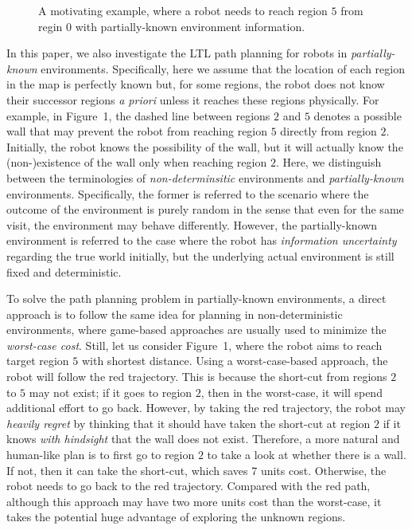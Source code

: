 \documentclass{ifacconf}
\begin{document}
  

\newcommand\kk{1.2}
\begin{figure}
\centering

	\caption{A motivating example, where a robot needs to reach region $5$ from regin $0$ with partially-known environment information.}
	\label{fig:motiexam}
\end{figure}   


In this paper, we also investigate the LTL path planning for robots in \emph{partially-known} environments. Specifically, here we assume that the location of each region in the map is perfectly known but, for some regions, the robot does not know their successor regions \emph{a priori} unless it reaches these regions physically. For example, in Figure~1, the dashed line between regions $2$ and $5$ denotes a possible wall that may prevent the robot from reaching region $5$ directly from region $2$. Initially, the robot knows the possibility of the wall, but it will actually know the (non-)existence of the wall only when reaching region $2$.  Here, we distinguish between the terminologies of \emph{non-determinsitic} environments and \emph{partially-known} environments. Specifically, the former is referred to the scenario where the outcome of the environment is purely random in the sense that even for the same visit, the environment may behave differently. However, the partially-known environment is referred to the case where the robot has \emph{information uncertainty} regarding the true world initially, but the underlying actual environment is still fixed and deterministic. 

To solve the path planning problem in partially-known environments, a direct approach is to follow the same idea for planning in non-deterministic environments, where game-based approaches are usually used to minimize the \emph{worst-case cost}. Still, let us consider Figure~1, where the robot aims to reach target region $5$ with shortest distance. 
Using a worst-case-based approach, the robot will follow the red trajectory. This is because the short-cut from regions $2$ to $5$ may not exist; if it goes to region $2$, then in the worst-case, it will spend additional effort to go back. However, by taking the red trajectory, the robot may \emph{heavily regret} by thinking that it should have taken the short-cut at region $2$ if it knows \emph{with hindsight} that the wall does not exist. Therefore, a more natural and human-like plan  is to first go to region $2$ to take a look at whether there is a wall. If not, then it can take the short-cut, which saves 7 units cost.  Otherwise, the robot needs to go back to the red trajectory.  Compared with the red path, although this approach may have two more units cost than the worst-case, it takes the potential huge advantage of exploring the unknown regions. 
\end{document}
